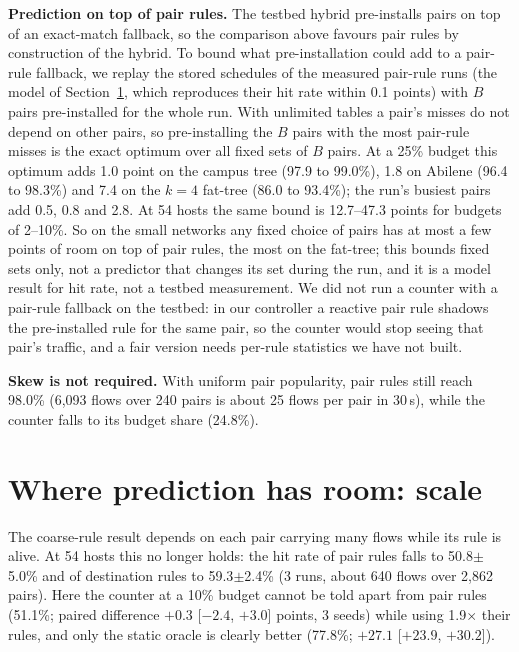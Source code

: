 \documentclass[conference]{IEEEtran}
\begin{document}
\textbf{Prediction on top of pair rules.} The testbed hybrid pre-installs pairs on top of an exact-match fallback, so the comparison above favours pair rules by construction of the hybrid. To bound what pre-installation could add to a pair-rule fallback, we replay the stored schedules of the measured pair-rule runs (the model of Section~\ref{sec:scale}, which reproduces their hit rate within 0.1 points) with $B$ pairs pre-installed for the whole run. With unlimited tables a pair's misses do not depend on other pairs, so pre-installing the $B$ pairs with the most pair-rule misses is the exact optimum over all fixed sets of $B$ pairs. At a 25\% budget this optimum adds 1.0 point on the campus tree (97.9 to 99.0\%), 1.8 on Abilene (96.4 to 98.3\%) and 7.4 on the $k{=}4$ fat-tree (86.0 to 93.4\%); the run's busiest pairs add 0.5, 0.8 and 2.8. At 54 hosts the same bound is 12.7--47.3 points for budgets of 2--10\%. So on the small networks any fixed choice of pairs has at most a few points of room on top of pair rules, the most on the fat-tree; this bounds fixed sets only, not a predictor that changes its set during the run, and it is a model result for hit rate, not a testbed measurement. We did not run a counter with a pair-rule fallback on the testbed: in our controller a reactive pair rule shadows the pre-installed rule for the same pair, so the counter would stop seeing that pair's traffic, and a fair version needs per-rule statistics we have not built.

\textbf{Skew is not required.} With uniform pair popularity, pair rules still reach 98.0\% (6,093 flows over 240 pairs is about 25 flows per pair in 30\,s), while the counter falls to its budget share (24.8\%).

\section{Where prediction has room: scale}\label{sec:scale}

The coarse-rule result depends on each pair carrying many flows while its rule is alive. At 54 hosts this no longer holds: the hit rate of pair rules falls to 50.8$\pm$5.0\% and of destination rules to 59.3$\pm$2.4\% (3 runs, about 640 flows over 2,862 pairs). Here the counter at a 10\% budget cannot be told apart from pair rules (51.1\%; paired difference $+0.3$ [$-2.4$, $+3.0$] points, 3 seeds) while using 1.9$\times$ their rules, and only the static oracle is clearly better (77.8\%; $+27.1$ [$+23.9$, $+30.2$]).
\end{document}
